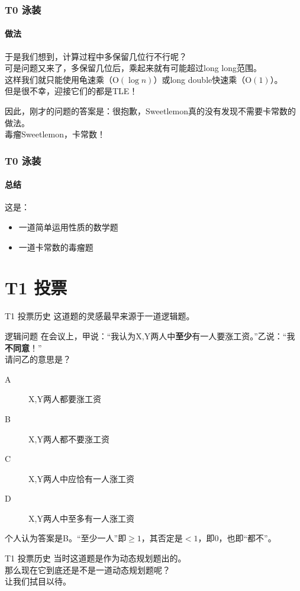 \documentclass[utf8]{beamer}
\begin{document}
\begin{frame}
    \frametitle{T0 泳装}
    \framesubtitle{做法}
    于是我们想到，计算过程中多保留几位行不行呢？\\
    \pause
    可是问题又来了，多保留几位后，乘起来就有可能超过long long范围。\\
    这样我们就只能使用龟速乘（$\text{O}(\log n)$）或long double快速乘（$\text{O}(1)$）。\\
    \pause
    但是很不幸，迎接它们的都是\textcolor{tle}{TLE}！\newline

    \pause
    因此，刚才的问题的答案是：很抱歉，Sweetlemon真的没有发现不需要卡常数的做法。\\
    \pause
    毒瘤Sweetlemon，卡常数！
    
\end{frame}
\begin{frame}
    \frametitle{T0 泳装}
    \framesubtitle{总结}
    这是：
    \begin{itemize}
        \item 一道简单运用性质的数学题
        \item 一道卡常数的毒瘤题
    \end{itemize}
    
\end{frame}

\section{T1 投票}

\begin{frame}{T1 投票}{历史}
    这道题的灵感最早来源于一道逻辑题。
    \begin{block}{逻辑问题}
        在会议上，甲说：“我认为X,Y两人中\textbf{至少}有一人要涨工资。”乙说：“我\textbf{不同意}！”\\
        请问乙的意思是？\\
        \begin{description}
            \item[A] X,Y两人都要涨工资
            \item[B] X,Y两人都不要涨工资
            \item[C] X,Y两人中应恰有一人涨工资
            \item[D] X,Y两人中至多有一人涨工资   
        \end{description}
    \end{block}
    \pause
    个人认为答案是B。“至少一人”即$\ge 1$，其否定是$<1$，即$0$，也即“都不”。

\end{frame}
\begin{frame}{T1 投票}{历史}
    当时这道题是作为动态规划题出的。\\
    \pause
    那么现在它到底还是不是一道动态规划题呢？\\
    \pause
    让我们拭目以待。

\end{frame}
\end{document}
